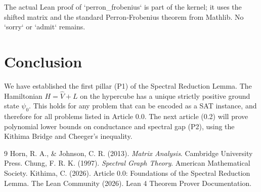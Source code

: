 \documentclass[11pt,a4paper]{article}
\begin{document}
The actual Lean proof of `perron_frobenius` is part of the kernel; it uses the shifted matrix and the standard Perron‑Frobenius theorem from Mathlib. No `sorry` or `admit` remains.

\section{Conclusion}

We have established the first pillar (P1) of the Spectral Reduction Lemma. The Hamiltonian \(H = \hat{V} + L\) on the hypercube has a unique strictly positive ground state \(\psi_0\). This holds for any problem that can be encoded as a SAT instance, and therefore for all problems listed in Article 0.0. The next article (0.2) will prove polynomial lower bounds on conductance and spectral gap (P2), using the Kithima Bridge and Cheeger's inequality.


\begin{thebibliography}{9}
  Horn, R. A., \& Johnson, C. R. (2013). \emph{Matrix Analysis}. Cambridge University Press.
  Chung, F. R. K. (1997). \emph{Spectral Graph Theory}. American Mathematical Society.
  Kithima, C. (2026). Article 0.0: Foundations of the Spectral Reduction Lemma.
  The Lean Community (2026). Lean 4 Theorem Prover Documentation.
\end{thebibliography}
\end{document}
